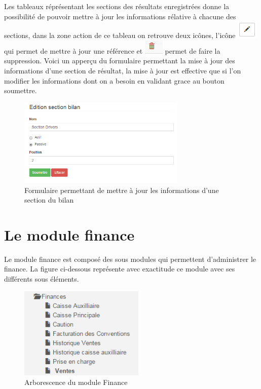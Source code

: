 \documentclass[12pt,a4paper]{report}
\begin{document}
\newpage
Les tableaux réprésentant les sections des résultats enregistrées donne la possibilité de pouvoir mettre à jour les informations rélative à chacune des sections, dans la zone action de ce tableau on retrouve deux icônes, l'icône \includegraphics[scale=0.7]{pic/EditBlack.png} qui permet de mettre à jour une référence et \includegraphics[scale=0.7]{pic/DeleteWRed.png} permet de faire la suppression.
Voici un apperçu du formulaire permettant la mise à jour des informations d'une section de résultat, la mise à jour est effective que si l'on modifier les informations dont on a besoin en validant grace au bouton soumettre. 

\begin{figure}[h]
\begin{center}
\includegraphics[width=8cm]{pic/EditSectBilan.png}
\end{center}
\caption{Formulaire permettant de mettre à jour les informations d'une section du bilan}
\label{Formulaire permettant de mettre à jour les informations d'une section du bilan}
\end{figure} 




\newpage
\chapter{Le module finance}        
Le module finance est composé des sous modules qui permettent d'administrer le finance. La figure ci-dessous représente avec exactitude ce module avec ses différents sous éléments.

\begin{figure}[h]
\begin{center}
\includegraphics[width=6cm]{pic/FinanceArbo.png}
\end{center}
\caption{Arborescence du module Finance}
\label{Arborescence du module Finance}
\end{figure}
\end{document}
